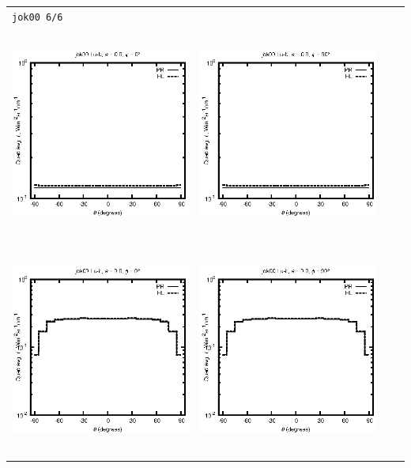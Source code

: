 \documentclass[10pt,a4paper]{article}
\begin{document}
\begin{adjustwidth}{-1.2in}{-1.2in}
\begin{tabular}{c c c c}
\multicolumn{4}{l}{\texttt{jok00 6/6}} \\
\includegraphics[height=7cm]{../eps/jok00_Lu_b_fwd.eps} &
\includegraphics[height=7cm]{../eps/jok00_Lu_b_cross.eps} \\
\includegraphics[height=7cm]{../eps/jok00_Lu_it_fwd.eps} &
\includegraphics[height=7cm]{../eps/jok00_Lu_it_cross.eps} \\

\end{tabular}
\end{adjustwidth}
\end{document}
